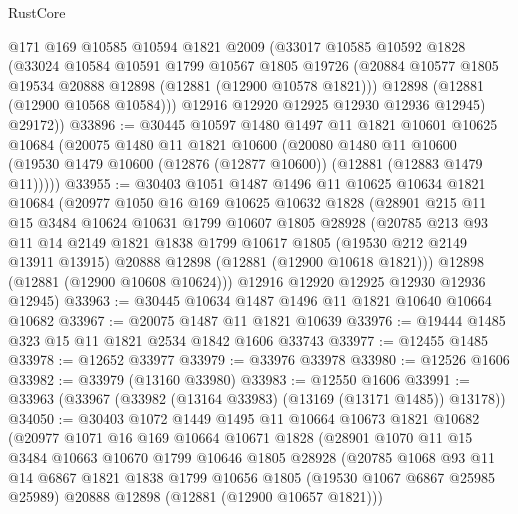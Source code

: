\begin{lexlean}{RustCore}
\begin{coremodule}
        @171
        @169
        @10585
        @10594
        @1821
        @2009
        (@33017
          @10585
          @10592
          @1828
          (@33024
            @10584
            @10591
            @1799
            @10567
            @1805
            @19726
            (@20884 @10577 @1805 @19534 @20888 @12898 (@12881 (@12900 @10578 @1821)))
            @12898
            (@12881 (@12900 @10568 @10584)))
          @12916
          @12920
          @12925
          @12930
          @12936
          @12945)
        @29172))
@33896 := @30445
    @10597
    @1480
    @1497
    @11
    @1821
    @10601
    @10625
    @10684
    (@20075
      @1480
      @11
      @1821
      @10600
      (@20080
        @1480
        @11
        @10600
        (@19530 @1479 @10600 (@12876 (@12877 @10600)) (@12881 (@12883 @1479 @11)))))
@33955 := @30403
    @1051
    @1487
    @1496
    @11
    @10625
    @10634
    @1821
    @10684
    (@20977
      @1050
      @16
      @169
      @10625
      @10632
      @1828
      (@28901
        @215
        @11
        @15
        @3484
        @10624
        @10631
        @1799
        @10607
        @1805
        @28928
        (@20785
          @213
          @93
          @11
          @14
          @2149
          @1821
          @1838
          @1799
          @10617
          @1805
          (@19530 @212 @2149 @13911 @13915)
          @20888
          @12898
          (@12881 (@12900 @10618 @1821)))
        @12898
        (@12881 (@12900 @10608 @10624)))
      @12916
      @12920
      @12925
      @12930
      @12936
      @12945)
@33963 := @30445 @10634 @1487 @1496 @11 @1821 @10640 @10664 @10682
@33967 := @20075 @1487 @11 @1821 @10639
@33976 := @19444 @1485 @323 @15 @11 @1821 @2534 @1842 @1606 @33743
@33977 := @12455 @1485
@33978 := @12652 @33977
@33979 := @33976 @33978
@33980 := @12526 @1606
@33982 := @33979 (@13160 @33980)
@33983 := @12550 @1606
@33991 := @33963 (@33967 (@33982 (@13164 @33983) (@13169 (@13171 @1485)) @13178))
@34050 := @30403
    @1072
    @1449
    @1495
    @11
    @10664
    @10673
    @1821
    @10682
    (@20977
      @1071
      @16
      @169
      @10664
      @10671
      @1828
      (@28901
        @1070
        @11
        @15
        @3484
        @10663
        @10670
        @1799
        @10646
        @1805
        @28928
        (@20785
          @1068
          @93
          @11
          @14
          @6867
          @1821
          @1838
          @1799
          @10656
          @1805
          (@19530 @1067 @6867 @25985 @25989)
          @20888
          @12898
          (@12881 (@12900 @10657 @1821)))

\end{coremodule}
\end{lexlean}
